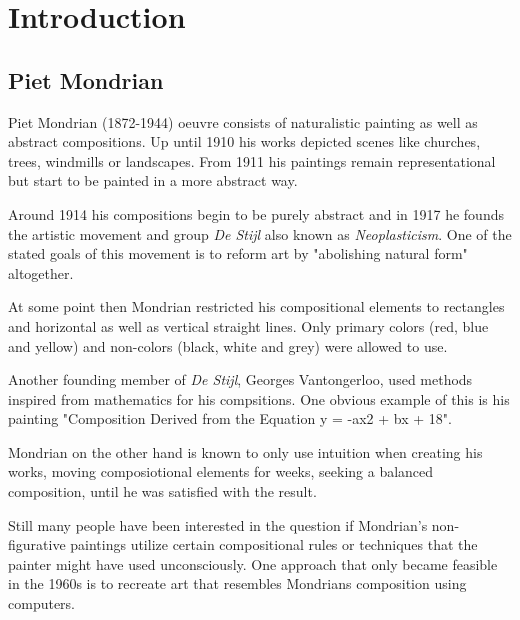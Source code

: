 \section{Introduction}

\subsection{Piet Mondrian}

Piet Mondrian (1872-1944) oeuvre consists of naturalistic painting as well
as abstract compositions. Up until 1910 his works depicted scenes like
churches, trees, windmills or landscapes. From 1911 his paintings
remain representational but start to be painted in a more abstract way.

Around 1914 his compositions begin to be purely abstract and in 1917 he founds
the artistic movement and group \textit{De Stijl} also known as
\textit{Neoplasticism}. One of the stated goals of this movement is to reform
art by "abolishing natural form" \cite{wiki:manifest} altogether.


At some point then Mondrian restricted his compositional elements to rectangles
and horizontal as well as vertical straight lines. Only primary colors (red,
blue and yellow) and non-colors (black, white and grey) were allowed to use.

Another founding member of \textit{De Stijl}, Georges Vantongerloo, used methods
inspired from mathematics for his compsitions. One obvious example of this is
his painting "Composition Derived from the Equation y = -ax2 + bx + 18".

Mondrian on the other hand is known to only use intuition when creating his
works, moving composiotional elements for weeks, seeking a balanced composition,
until he was satisfied with the result.

Still many people have been interested in the question if Mondrian's
non-figurative paintings utilize certain compositional rules or techniques that
the painter might have used unconsciously. One approach that only became
feasible in the 1960s is to recreate art that resembles Mondrians composition
using computers.

